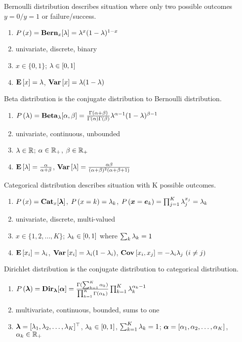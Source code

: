 \begin{description}[leftmargin=0cm]
\item[Bernoulli] Bernoulli distribution describes situation where only two possible outcomes $y=0 / y=1$ or failure/success.
	\begin{enumerate}
		\item $P\left(x\right)=\mathbf{Bern}_x[\lambda]=\lambda^x(1-\lambda)^{1-x}$
		\item univariate, discrete, binary
		\item $x \in \{0,1\}$; $\lambda \in [0,1]$
		\item $\mathbf{E}\left[x\right]=\lambda$, $\mathbf{Var}\left[x\right]=\lambda(1-\lambda)$
	\end{enumerate}
\item[Beta] Beta distribution is the conjugate distribution to Bernoulli distribution.
	\begin{enumerate}
		\item $P\left(\lambda\right)=\mathbf{Beta}_\lambda[\alpha,\beta]=\frac{\Gamma(\alpha+\beta)}{\Gamma(\alpha)\Gamma(\beta)}\lambda^{\alpha-1}(1-\lambda)^{\beta-1}$
		\item univariate, continuous, unbounded
		\item $\lambda \in \mathbb{R}$; $\alpha \in \mathbb{R}_+$,  $\beta \in \mathbb{R}_+$
		\item $\mathbf{E}\left[\lambda\right]=\frac{\alpha}{\alpha+\beta}$, $\mathbf{Var}\left[\lambda\right]=\frac{\alpha\beta}{(\alpha+\beta)^2(\alpha+\beta+1)}$
	\end{enumerate}
\item[Categorical] Categorical distribution describes situation with K possible outcomes.
	\begin{enumerate}
		\item $P\left(x\right)=\mathbf{Cat}_x[\boldsymbol{\lambda}]$, $P\left(x=k\right)=\lambda_k$,  $P\left(\boldsymbol{x}=\boldsymbol{e}_k\right)=\prod_{j=1}^K\lambda_j^{x_j}=\lambda_k$
		\item univariate, discrete, multi-valued
		\item $x \in \{1,2,\dotsc,K\}$; $\lambda_k \in [0,1]$ where $\sum_k\lambda_k=1$
		\item $\mathbf{E}\left[x_i\right]=\lambda_i$, $\mathbf{Var}\left[x_i\right]=\lambda_i(1-\lambda_i)$, $\mathbf{Cov}\left[x_i,x_j\right]=-\lambda_i\lambda_j\ (i \neq j)$
	\end{enumerate}
\item[Dirichlet] Dirichlet distribution is the conjugate distribution to categorical distribution.
	\begin{enumerate}
		\item $P\left(\boldsymbol{\lambda}\right)=\mathbf{Dir}_{\boldsymbol{\lambda}}[\boldsymbol{\alpha}]=\frac{\Gamma(\sum_{k=1}^K\alpha_k)}{\prod_{k=1}^K\Gamma(\alpha_k)}\prod_{k=1}^K\lambda_k^{\alpha_k-1}$
		\item multivariate, continuous, bounded, sums to one
		\item $\boldsymbol{\lambda}=[\lambda_1,\lambda_2,\dotsc,\lambda_K]{}^\top$, $\lambda_k \in [0,1]$, $\sum_{k=1}^K\lambda_k=1$; $\boldsymbol{\alpha}=[\alpha_1,\alpha_2,\dotsc,\alpha_K]$, $\alpha_k \in \mathbb{R}_+$

\end{enumerate}
\end{description}
